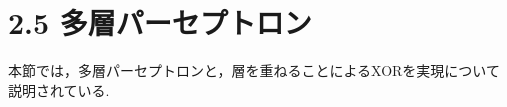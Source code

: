 \documentclass[dvipdfmx]{jsarticle}
\begin{document}
\section*{2.5 多層パーセプトロン}
本節では，多層パーセプトロンと，層を重ねることによるXORを実現について説明されている.
\begin{thebibliography}{}
\item
\end{thebibliography}
\end{document}
